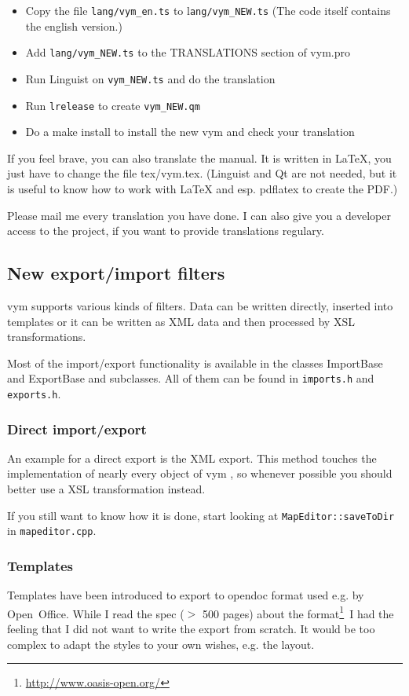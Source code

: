 \documentclass[12pt,a4paper]{article}
\newcommand{\vym}{{\sc vym }}
\begin{document}
\begin{appendix}
\begin{itemize}
    \item Copy the file {\tt lang/vym\_en.ts} to l{\tt ang/vym\_NEW.ts}
    (The code itself contains the english version.)
        
    \item Add {\tt lang/vym\_NEW.ts} to the TRANSLATIONS section of
    vym.pro

    \item Run Linguist on {\tt vym\_NEW.ts} and do the translation

    \item Run {\tt lrelease} to create {\tt vym\_NEW.qm}

    \item Do a make install to install the new vym and check your
    translation
\end{itemize}

If you feel brave, you can also translate the manual. It is written in
LaTeX, you just have to change the file tex/vym.tex. (Linguist and Qt
are not needed, but it is useful to know how to work with LaTeX and esp.
pdflatex to create the PDF.) 

Please mail me every translation you have done. I can also give you a
developer access to the project, if you want to provide translations
regulary.  

\subsection{New export/import filters}
\vym supports various kinds of filters. Data can be written directly,
inserted into templates or it can be written as XML data and then
processed by XSL transformations. 

Most of the import/export functionality is available in the classes
ImportBase and ExportBase and subclasses. All of them can be found in
{\tt imports.h} and {\tt exports.h}.

\subsubsection*{Direct import/export}
An example for a direct export is the XML export. This method touches
the implementation of nearly every object of \vym, so whenever possible
you should better use a XSL transformation instead.

If you still want to know how it is done, start looking at 
{\tt MapEditor::saveToDir} in {\tt mapeditor.cpp}.

\subsubsection*{Templates}
Templates have been introduced to export to opendoc format used e.g. by
Open~Office. While I read the spec ($>$ 500 pages) about the format\footnote{
\href{http://www.oasis-open.org/}{http://www.oasis-open.org/}}\ 
I had the feeling that I did not want to write the export from scratch. 
It would be too complex to adapt the styles to your own wishes, e.g. the
layout.


\end{appendix}
\end{document}
